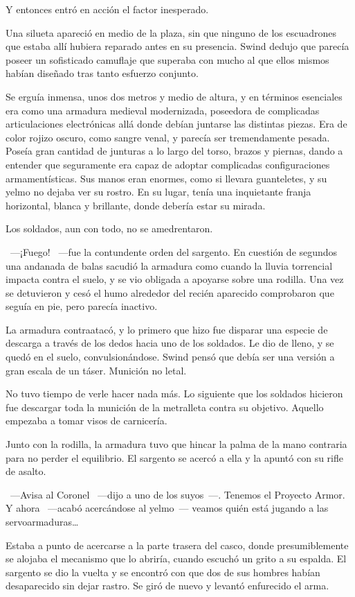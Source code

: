 Y entonces entró en acción el factor inesperado.

Una silueta apareció en medio de la plaza, sin que ninguno de los escuadrones que estaba allí hubiera reparado antes en su presencia. Swind dedujo que parecía poseer un sofisticado camuflaje que superaba con mucho al que ellos mismos habían diseñado tras tanto esfuerzo conjunto.

Se erguía inmensa, unos dos metros y medio de altura, y en términos esenciales era como una armadura medieval modernizada, poseedora de complicadas articulaciones electrónicas allá donde debían juntarse las distintas piezas. Era de color rojizo oscuro, como sangre venal, y parecía ser tremendamente pesada. Poseía gran cantidad de junturas a lo largo del torso, brazos y piernas, dando a entender que seguramente era capaz de adoptar complicadas configuraciones armamentísticas. Sus manos eran enormes, como si llevara guanteletes, y su yelmo no dejaba ver su rostro. En su lugar, tenía una inquietante franja horizontal, blanca y brillante, donde debería estar su mirada.

Los soldados, aun con todo, no se amedrentaron.

~---¡Fuego! ~---fue la contundente orden del sargento. En cuestión de segundos una andanada de balas sacudió la armadura como cuando la lluvia torrencial impacta contra el suelo, y se vio obligada a apoyarse sobre una rodilla. Una vez se detuvieron y cesó el humo alrededor del recién aparecido comprobaron que seguía en pie, pero parecía inactivo.

La armadura contraatacó, y lo primero que hizo fue disparar una especie de descarga a través de los dedos hacia uno de los soldados. Le dio de lleno, y se quedó en el suelo, convulsionándose. Swind pensó que debía ser una versión a gran escala de un táser. Munición no letal.

No tuvo tiempo de verle hacer nada más. Lo siguiente que los soldados hicieron fue descargar toda la munición de la metralleta contra su objetivo. Aquello empezaba a tomar visos de carnicería.

Junto con la rodilla, la armadura tuvo que hincar la palma de la mano contraria para no perder el equilibrio. El sargento se acercó a ella y la apuntó con su rifle de asalto.

~---Avisa al Coronel ~---dijo a uno de los suyos~---. Tenemos el Proyecto Armor. Y ahora ~---acabó acercándose al yelmo~--- veamos quién está jugando a las servoarmaduras\dots

Estaba a punto de acercarse a la parte trasera del casco, donde presumiblemente se alojaba el mecanismo que lo abriría, cuando escuchó un grito a su espalda. El sargento se dio la vuelta y se encontró con que dos de sus hombres habían desaparecido sin dejar rastro. Se giró de nuevo y levantó enfurecido el arma.


